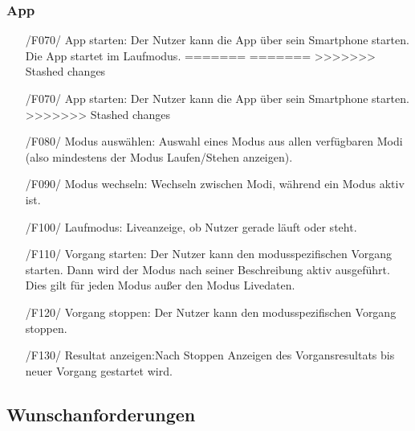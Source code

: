 \documentclass[a4paper,12pt]{article}
\begin{document}
    \subsubsection{App}
      \begin{itemize}
<<<<<<< Updated upstream
<<<<<<< Updated upstream
      \item[/F070/] \textsf{App starten:} Der Nutzer kann die App über sein Smartphone starten. Die App startet im Laufmodus.%
=======
=======
>>>>>>> Stashed changes
      \item[/F070/] \textsf{App starten:} Der Nutzer kann die App über sein Smartphone starten. %
>>>>>>> Stashed changes
      \item[/F080/] \textsf{Modus auswählen:} Auswahl eines Modus aus allen verfügbaren Modi (also mindestens der Modus \glqq Laufen/Stehen anzeigen\grqq). 
      \item[/F090/] \textsf{Modus wechseln:} Wechseln zwischen Modi, während ein Modus aktiv ist. %
      \item[/F100/] \textsf{Laufmodus:} Liveanzeige, ob Nutzer gerade \glqq läuft\grqq{} oder \glqq steht\grqq{}.
      \item[/F110/] \textsf{Vorgang starten:} Der Nutzer kann den modusspezifischen Vorgang starten. Dann wird der Modus nach seiner Beschreibung aktiv ausgeführt. Dies gilt für jeden Modus außer den Modus \glqq Livedaten\grqq.
      \item[/F120/] \textsf{Vorgang stoppen:} Der Nutzer kann den modusspezifischen Vorgang stoppen.
      \item[/F130/] \textsf{Resultat anzeigen:}Nach Stoppen Anzeigen des Vorgansresultats bis neuer Vorgang gestartet wird.
    \end{itemize}
  \subsection{Wunschanforderungen}
\end{document}
